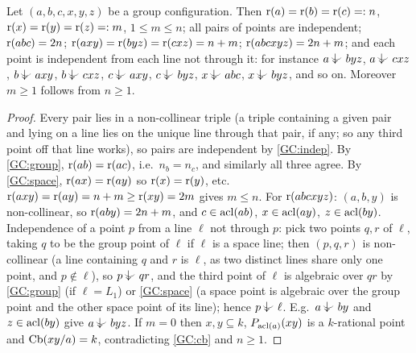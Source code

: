 \begin{lemma}[ranks]\label{lem:gc-ranks}
Let $(a,b,c,x,y,z)$ be a group configuration.  Then $\operatorname{r}(a)=\operatorname{r}(b)=\operatorname{r}(c)=:n$,
$\operatorname{r}(x)=\operatorname{r}(y)=\operatorname{r}(z)=:m$, $1\le m\le n$; all pairs of points are independent;
$\operatorname{r}(abc)=2n$; $\operatorname{r}(axy)=\operatorname{r}(byz)=\operatorname{r}(cxz)=n+m$; $\operatorname{r}(abcxyz)=2n+m$; and each point
is independent from each line not through it: for instance $a\ind{}byz$, $a\ind{}cxz$,
$b\ind{}axy$, $b\ind{}cxz$, $c\ind{}axy$, $c\ind{}byz$, $x\ind{}abc$, $x\ind{}byz$, and
so on.  Moreover $m\ge 1$ follows from $n\ge1$.
\end{lemma}
\begin{proof}
Every pair lies in a non-collinear triple (a triple containing a given pair and lying
on a line lies on the unique line through that pair, if any; so any third point off that
line works), so pairs are independent by \ref{GC:indep}.  By \ref{GC:group}, $\operatorname{r}(ab)=\operatorname{r}(ac)$, i.e.\ $n_b=n_c$,
and similarly all three agree.  By \ref{GC:space}, $\operatorname{r}(ax)=\operatorname{r}(ay)$ so $\operatorname{r}(x)=\operatorname{r}(y)$,
etc.  $\operatorname{r}(axy)=\operatorname{r}(ay)=n+m\ge\operatorname{r}(xy)=2m$ gives $m\le n$.  For $\operatorname{r}(abcxyz)$: $(a,b,y)$ is
non-collinear, so $\operatorname{r}(aby)=2n+m$, and $c\in\operatorname{acl}(ab)$, $x\in\operatorname{acl}(ay)$, $z\in\operatorname{acl}(by)$.
Independence of a point $p$ from a line $\ell$ not through $p$: pick two points $q,r$
of $\ell$, taking $q$ to be the group point of $\ell$ if $\ell$ is a space line; then
$(p,q,r)$ is non-collinear (a line containing $q$ and $r$ is $\ell$, as two distinct
lines share only one point, and $p\notin\ell$), so $p\ind{}qr$, and the third point of $\ell$ is algebraic over $qr$ by \ref{GC:group} (if
$\ell=L_1$) or \ref{GC:space} (a space point is algebraic over the group point and the
other space point of its line); hence $p\ind{}\ell$.  E.g.\ $a\ind{}by$ and
$z\in\operatorname{acl}(by)$ give $a\ind{}byz$.  If $m=0$
then $x,y\subseteq k$, $P_{\operatorname{acl}(a)}(xy)$ is a $k$-rational point and $\operatorname{Cb}(xy/a)=k$,
contradicting \ref{GC:cb} and $n\ge1$.
\end{proof}

